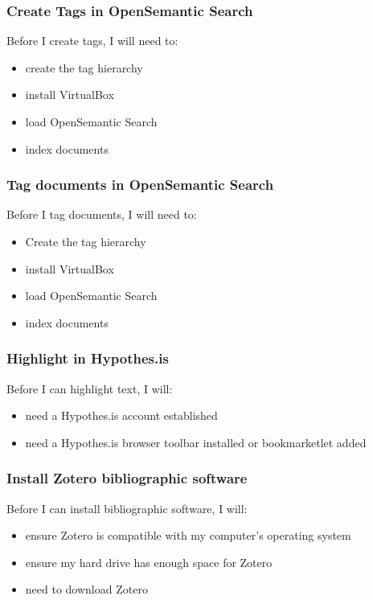 \documentclass{article}
\begin{document}
\subsubsection*{Create Tags in OpenSemantic Search}

Before I create tags, I will need to:
\begin{itemize}
\item create the tag hierarchy
\item install VirtualBox
\item load OpenSemantic Search
\item index documents
\end{itemize}

\subsubsection*{Tag documents in OpenSemantic Search}

Before I tag documents, I will need to:
\begin{itemize}
\item Create the tag hierarchy
\item install VirtualBox
\item load OpenSemantic Search
\item index documents
\end{itemize}

\subsubsection*{Highlight in Hypothes.is}

Before I can highlight text, I will:
\begin{itemize}
\item need a Hypothes.is account established
\item need a Hypothes.is browser toolbar installed or bookmarketlet added
\end{itemize}

\subsubsection*{Install Zotero bibliographic software}
Before I can install bibliographic software, I will:
\begin{itemize}
\item ensure Zotero is compatible with my computer's operating system
\item ensure my hard drive has enough space for Zotero
\item need to download Zotero
\end{itemize}
\end{document}
